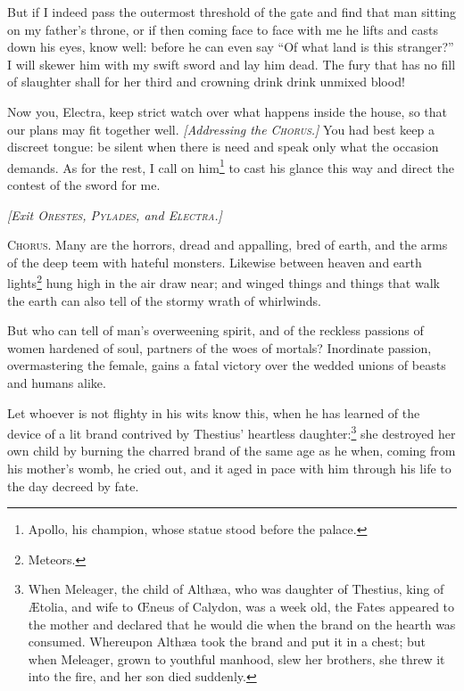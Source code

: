 \documentclass[12pt]{article}
\begin{document}
But if I indeed pass the outermost threshold of the gate and find that man sitting on my father's throne, or if then coming face to face with me he lifts and casts down his eyes, know well: before he can even say ``Of what land is this stranger?'' I will skewer him with my swift sword and lay him dead. The fury that has no fill of slaughter shall for her third and crowning drink drink unmixed blood!

Now you, Electra, keep strict watch over what happens inside the house, so that our plans may fit together well. \textit{[Addressing the \textsc{Chorus.}]} You had best keep a discreet tongue: be silent when there is need and speak only what the occasion demands. As for the rest, I call on him\footnote{Apollo, his champion, whose statue stood before the palace.} to cast his glance this way and direct the contest of the sword for me.

\begin{center}
\textit{[Exit \textsc{Orestes, Pylades,} and \textsc{Electra.}]}
\end{center}

\textsc{Chorus.} Many are the horrors, dread and appalling, bred of earth, and the arms of the deep teem with hateful monsters. Likewise between heaven and earth lights\footnote{Meteors.} hung high in the air draw near; and winged things and things that walk the earth can also tell of the stormy wrath of whirlwinds.

But who can tell of man's overweening spirit, and of the reckless passions of women hardened of soul, partners of the woes of mortals? Inordinate passion, overmastering the female, gains a fatal victory over the wedded unions of beasts and humans alike.

Let whoever is not flighty in his wits know this, when he has learned of the device of a lit brand contrived by Thestius' heartless daughter:\footnote{When Meleager, the child of Alth{\ae}a, who was daughter of Thestius, king of {\AE}tolia, and wife to {\OE}neus of Calydon, was a week old, the Fates appeared to the mother and declared that he would die when the brand on the hearth was consumed. Whereupon Alth{\ae}a took the brand and put it in a chest; but when Meleager, grown to youthful manhood, slew her brothers, she threw it into the fire, and her son died suddenly.} she destroyed her own child by burning the charred brand of the same age as he when, coming from his mother's womb, he cried out, and it aged in pace with him through his life to the day decreed by fate.
\end{document}
